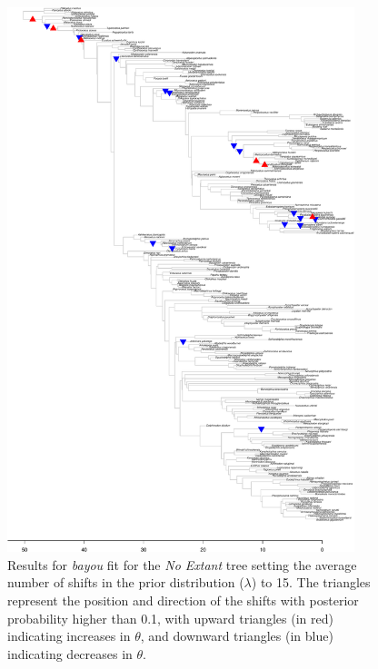 \begin{figure}[H]
\includegraphics[width=0.9\textwidth]{img/plots-noextant-wZBL-k15-1.pdf}
\caption{Results for \textit{bayou} fit for the \textit{No Extant} tree setting the average number of shifts in the prior distribution ($\lambda$) to 15. The triangles represent the position and direction of the shifts with posterior probability higher than 0.1, with upward triangles (in red) indicating increases in $\theta$, and downward triangles (in blue) indicating decreases in $\theta$.}
\label{fig:noextant-k15}
\end{figure}

\newpage

